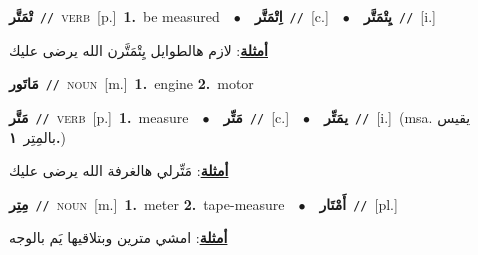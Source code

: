 \documentclass[10pt,a4paper,twoside]{article} %
\begin{document}
\begin{multicols}{2}
{\setlength\topsep{0pt}\textbf{\foreignlanguage{arabic}{تْمَتَّر}}\ {\color{gray}\texttt{//}\color{black}}\ \textsc{verb}\ [p.]\ \textbf{1.}~be measured\ \ $\bullet$\ \ \setlength\topsep{0pt}\textbf{\foreignlanguage{arabic}{اِتْمَتَّر}}\ {\color{gray}\texttt{//}\color{black}}\ [c.]\ \ $\bullet$\ \ \setlength\topsep{0pt}\textbf{\foreignlanguage{arabic}{يِتْمَتَّر}}\ {\color{gray}\texttt{//}\color{black}}\ [i.]\  \begin{flushright}\color{gray}\foreignlanguage{arabic}{\textbf{\underline{\foreignlanguage{arabic}{أمثلة}}}: لازم هالطوايل يِتْمَتَّرن الله يرضى عليك}\end{flushright}\color{black}} \vspace{2mm}

{\setlength\topsep{0pt}\textbf{\foreignlanguage{arabic}{مَاتَور}}\ {\color{gray}\texttt{//}\color{black}}\ \textsc{noun}\ [m.]\ \textbf{1.}~engine  \textbf{2.}~motor\ } \vspace{2mm}

{\setlength\topsep{0pt}\textbf{\foreignlanguage{arabic}{مَتَّر}}\ {\color{gray}\texttt{//}\color{black}}\ \textsc{verb}\ [p.]\ \textbf{1.}~measure\ \ $\bullet$\ \ \setlength\topsep{0pt}\textbf{\foreignlanguage{arabic}{مَتِّر}}\ {\color{gray}\texttt{//}\color{black}}\ [c.]\ \ $\bullet$\ \ \setlength\topsep{0pt}\textbf{\foreignlanguage{arabic}{يمَتِّر}}\ {\color{gray}\texttt{//}\color{black}}\ [i.]\ \color{gray}(msa. \foreignlanguage{arabic}{يقيس بالمِتِر}~\foreignlanguage{arabic}{\textbf{١.}})\color{black}\  \begin{flushright}\color{gray}\foreignlanguage{arabic}{\textbf{\underline{\foreignlanguage{arabic}{أمثلة}}}: مَتِّرلي هالغرفة الله يرضى عليك}\end{flushright}\color{black}} \vspace{2mm}

{\setlength\topsep{0pt}\textbf{\foreignlanguage{arabic}{مِتِر}}\ {\color{gray}\texttt{//}\color{black}}\ \textsc{noun}\ [m.]\ \textbf{1.}~meter  \textbf{2.}~tape-measure\ \ $\bullet$\ \ \setlength\topsep{0pt}\textbf{\foreignlanguage{arabic}{أَمْتَار}}\ {\color{gray}\texttt{//}\color{black}}\ [pl.]\  \begin{flushright}\color{gray}\foreignlanguage{arabic}{\textbf{\underline{\foreignlanguage{arabic}{أمثلة}}}: امشي مترين وبتلاقيها يَم بالوجه}\end{flushright}\color{black}} \vspace{2mm}


\end{multicols}
\end{document}
